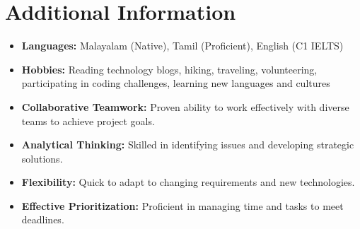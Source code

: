 \documentclass[a4paper,10pt]{article}
\begin{document}
\section{Additional Information}
\begin{itemize}[leftmargin=0.15in, label={\textbullet}]
  \item \textbf{Languages:} Malayalam (Native), Tamil (Proficient), English (C1 IELTS)
  \item \textbf{Hobbies:} Reading technology blogs, hiking, traveling, volunteering, participating in coding challenges, learning new languages and cultures
  \item \textbf{Collaborative Teamwork:} Proven ability to work effectively with diverse teams to achieve project goals.
  \item \textbf{Analytical Thinking:} Skilled in identifying issues and developing strategic solutions.
  \item \textbf{Flexibility:} Quick to adapt to changing requirements and new technologies.
  \item \textbf{Effective Prioritization:} Proficient in managing time and tasks to meet deadlines.
\end{itemize}
\end{document}
